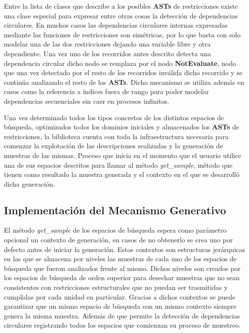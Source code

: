Entre la lista de clases que describe a los posibles {\bf ASTs} de restricciones existe una clase especial para expresar entre otras cosas
la detección de dependencias circulares. En muchos casos las dependencias circulares internas expresadas mediante las
funciones de restricciones son simétricas, por lo que basta con solo modelar una de las dos restricciones dejando una variable libre
y otra dependiente. Una vez uno de los recorridos antes descrito detecta una dependencia circular dicho nodo se remplaza por el nodo {\bf NotEvaluate},
nodo que una vez detectado por el resto de los recorridos inválida dicho recorrido y se continúa analizando el resto de los {\bf ASTs}.
Dicho mecanismo se utiliza además en casos como la referencia a índices fuera de rango para poder modelar dependencias secuenciales
sin caer en procesos infinitos.


Una vez determinado todos los tipos concretos de los distintos espacios de búsqueda, optimizados todos los dominios iniciales y
almacenados los {\bf ASTs} de restricciones, la biblioteca cuenta con toda la infraestructura necesaria para comenzar la explotación
de las descripciones realizadas y la generación de muestras de las mismas. Proceso que inicia en el momento que el usuario
utilice una de sus espacios descritos para llamar al método {\it get\_sample}, método que tienen como resultado la muestra generada y
el contexto en el que se desarrolló dicha generación.

\subsection{Implementación del Mecanismo Generativo}

El método {\it get\_sample} de los espacios de búsqueda espera como parámetro opcional un contexto de generación, en casos de no
obtenerlo se crea uno por defecto antes de iniciar la generación. Estos contextos son estructuras jerárquicas en las que se
almacena por niveles las muestras de cada uno de los espacios de búsqueda que fueron analizados frente al mismo. Dichos niveles
son creados por los espacios de búsqueda de orden superior para desechar muestras que no sean consistentes con restricciones
estructurales que no puedan ser trasmitidas y cumplidas por cada unidad en particular. Gracias a dichos contextos se puede
garantizar que un mismo espacio de búsqueda con un mismo contexto siempre genera la misma muestra. Además de que permite la
detección de dependencias circulares registrando todos los espacios que comienzan su proceso de muestreo.

